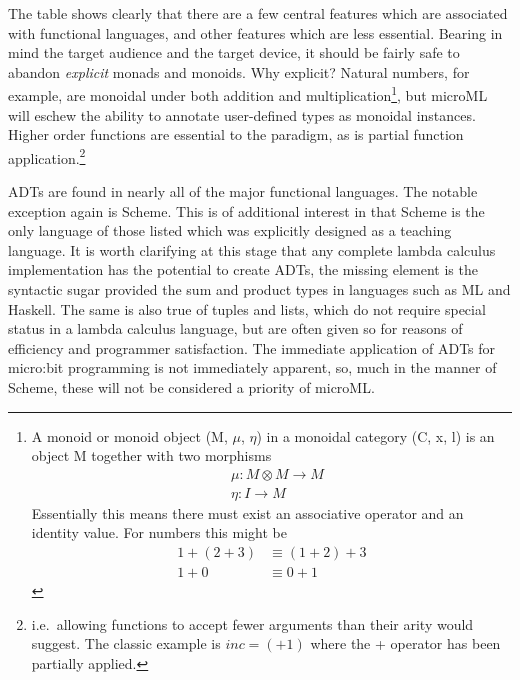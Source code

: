 \documentclass[12pt, a4paper]{report}
\begin{document}
The table shows clearly that there are a few central features which are associated with
functional languages, and other features which are less essential. Bearing in mind the target
audience and the target device, it should be fairly safe to abandon \textit{explicit} monads
and monoids. Why explicit? Natural numbers, for example, are monoidal under both addition and
multiplication\footnote{A monoid or monoid object (M, $\mu$, $\eta$) in a monoidal category (C, x,
l) is an object M together with two morphisms
\begin{align*}
    &\mu: M \otimes M \rightarrow M \\
    &\eta: I \rightarrow M
\end{align*}
Essentially this means there must exist an associative operator and an identity value. For numbers
this might be 
\begin{align*}
    1 + (2 + 3) &\equiv (1 + 2) + 3 \\
    1 + 0 &\equiv 0 + 1
\end{align*}
}, but microML will eschew the ability to annotate user-defined types as monoidal instances. Higher
order functions are essential to the paradigm, as is partial function application.\footnote{i.e.\
allowing functions to accept fewer arguments than their arity would suggest. The classic example is
$inc = (+1)$ where the + operator has been partially applied.}

\gls{ADT}s are found in nearly all of the major functional languages. The notable
exception again is Scheme. This is of additional interest in that Scheme is the only language of
those listed which was explicitly designed as a teaching language. It is worth clarifying at this
stage that any complete lambda calculus implementation has the potential to create ADTs, the missing
element is the syntactic sugar provided the sum and product types in languages such as ML and
Haskell. The same is also true of tuples and lists, which do not require special status in a
lambda calculus language, but are often given so for reasons of efficiency and programmer
satisfaction. The immediate application of ADTs for micro:bit programming is not immediately
apparent, so, much in the manner of Scheme, these will not be considered a priority of microML\@.
\end{document}
